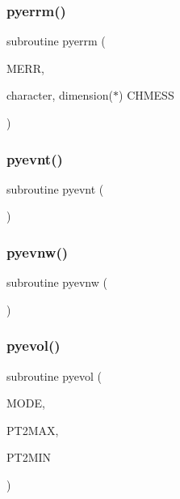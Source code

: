 \subsubsection{\texorpdfstring{pyerrm()}{pyerrm()}}
{\footnotesize\ttfamily subroutine pyerrm (\begin{DoxyParamCaption}\item[{}]{M\+E\+RR,  }\item[{character, dimension($\ast$)}]{C\+H\+M\+E\+SS }\end{DoxyParamCaption})}

\mbox{\label{pythia-6_84_824_8f_ac81fa418f8cd77b0873b2de2a4140933}} 
\subsubsection{\texorpdfstring{pyevnt()}{pyevnt()}}
{\footnotesize\ttfamily subroutine pyevnt (\begin{DoxyParamCaption}{ }\end{DoxyParamCaption})}

\mbox{\label{pythia-6_84_824_8f_a83ae6561ab82fd7af8b1b3e511f477ac}} 
\subsubsection{\texorpdfstring{pyevnw()}{pyevnw()}}
{\footnotesize\ttfamily subroutine pyevnw (\begin{DoxyParamCaption}{ }\end{DoxyParamCaption})}

\mbox{\label{pythia-6_84_824_8f_a15448b25c4eb515f33e35f86f376af68}} 
\subsubsection{\texorpdfstring{pyevol()}{pyevol()}}
{\footnotesize\ttfamily subroutine pyevol (\begin{DoxyParamCaption}\item[{}]{M\+O\+DE,  }\item[{}]{P\+T2\+M\+AX,  }\item[{}]{P\+T2\+M\+IN }\end{DoxyParamCaption})}

